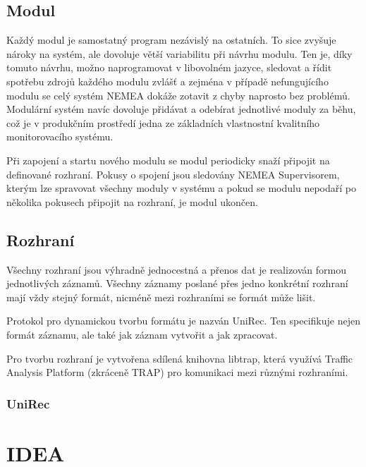 
\subsection{Modul}

Každý modul je samostatný program nezávislý na ostatních. To sice zvyšuje nároky na systém, ale dovoluje větší variabilitu při návrhu modulu. Ten je, díky tomuto návrhu, možno naprogramovat v libovolném jazyce, sledovat a řídit spotřebu zdrojů každého modulu zvlášť a zejména v případě nefungujícího modulu se celý systém NEMEA dokáže zotavit z chyby naprosto bez problémů. Modulární systém navíc dovoluje přidávat a odebírat jednotlivé moduly za běhu, což je v produkčním prostředí jedna ze základních vlastnostní kvalitního monitorovacího systému.

Při zapojení a startu nového modulu se modul periodicky snaží připojit na definované rozhraní. Pokusy o spojení jsou sledovány NEMEA Supervisorem, kterým lze spravovat všechny moduly v systému a pokud se modulu nepodaří po několika pokusech připojit na rozhraní, je modul ukončen.

\subsection{Rozhraní}

Všechny rozhraní jsou výhradně jednocestná a přenos dat je realizován formou jednotlivých záznamů. Všechny záznamy poslané přes jedno konkrétní rozhraní mají vždy stejný formát, nicméně mezi rozhraními se formát může lišit. 

Protokol pro dynamickou tvorbu formátu je nazván UniRec. Ten specifikuje nejen formát záznamu, ale také jak záznam vytvořit a jak zpracovat.

Pro tvorbu rozhraní je vytvořena sdílená knihovna libtrap, která využívá Traffic Analysis Platform (zkráceně TRAP) pro komunikaci mezi různými rozhraními.

\subsubsection{UniRec}

\section{IDEA}
\label{sec:idea}

